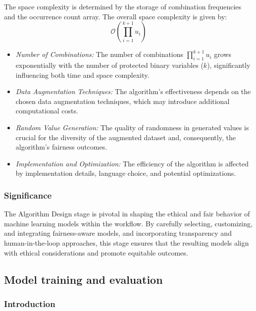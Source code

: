 The space complexity is determined by the storage of combination frequencies and the occurrence count array. The overall space complexity is given by:
\[
\mathcal{O}(\prod_{i=1}^{k+1} u_i)
\]

\begin{itemize}
    \item \emph{Number of Combinations:} The number of combinations \(\prod_{i=1}^{k+1} u_i\) grows exponentially with the number of protected binary variables (\(k\)), significantly influencing both time and space complexity.
    
    \item \emph{Data Augmentation Techniques:} The algorithm's effectiveness depends on the chosen data augmentation techniques, which may introduce additional computational costs.
    
    \item \emph{Random Value Generation:} The quality of randomness in generated values is crucial for the diversity of the augmented dataset and, consequently, the algorithm's fairness outcomes.
    
    \item \emph{Implementation and Optimization:} The efficiency of the algorithm is affected by implementation details, language choice, and potential optimizations.
\end{itemize}

\subsubsection{Significance}

The Algorithm Design stage is pivotal in shaping the ethical and fair behavior of machine learning models within the workflow. By carefully selecting, customizing, and integrating fairness-aware models, and incorporating transparency and human-in-the-loop approaches, this stage ensures that the resulting models align with ethical considerations and promote equitable outcomes.

\subsection{Model training and evaluation}
\label{subsection:model-training}

\subsubsection{Introduction}

